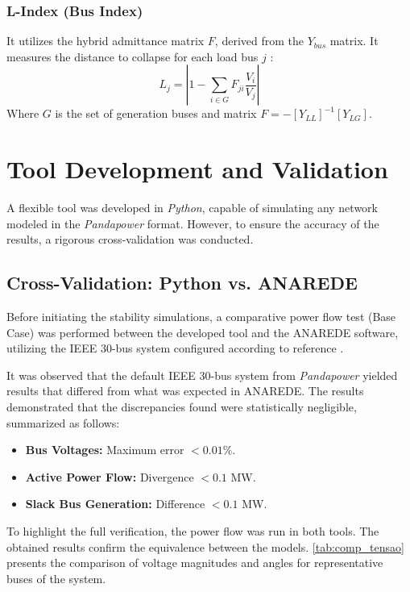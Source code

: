 \documentclass{ieeeaccess}
\begin{document}
\subsubsection{L-Index (Bus Index)}
It utilizes the hybrid admittance matrix $F$, derived from the $Y_{bus}$ matrix. It measures the distance to collapse for each load bus $j$ \cite{kessel}:
\begin{equation}
L_j = \left| 1 - \sum_{i \in G} F_{ji} \frac{V_i}{V_j} \right|
\end{equation}
Where $G$ is the set of generation buses and matrix $F = -[Y_{LL}]^{-1}[Y_{LG}]$.

\section{Tool Development and Validation}
\label{sec:tool}

A flexible tool was developed in \textit{Python}, capable of simulating any network modeled in the \textit{Pandapower} format. However, to ensure the accuracy of the results, a rigorous cross-validation was conducted.

\subsection{Cross-Validation: Python vs. ANAREDE}
Before initiating the stability simulations, a comparative power flow test (Base Case) was performed between the developed tool and the ANAREDE software, utilizing the IEEE 30-bus system configured according to reference \cite{madureira2023avaliacao}.

It was observed that the default IEEE 30-bus system from \textit{Pandapower} yielded results that differed from what was expected in ANAREDE. The results demonstrated that the discrepancies found were statistically negligible, summarized as follows:
\begin{itemize}
    \item \textbf{Bus Voltages:} Maximum error $< 0.01\%$.
    \item \textbf{Active Power Flow:} Divergence $< 0.1$ MW.
    \item \textbf{Slack Bus Generation:} Difference $< 0.1$ MW.
\end{itemize}

To highlight the full verification, the power flow was run in both tools. The obtained results confirm the equivalence between the models. \autoref{tab:comp_tensao} presents the comparison of voltage magnitudes and angles for representative buses of the system.
\end{document}
